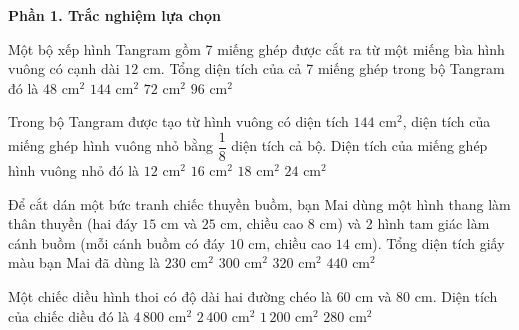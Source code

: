 \textbf{Phần 1. Trắc nghiệm lựa chọn}

\begin{ex} %
Một bộ xếp hình Tangram gồm 7 miếng ghép được cắt ra từ một miếng bìa hình vuông có cạnh dài $12\text{ cm}$. Tổng diện tích của cả 7 miếng ghép trong bộ Tangram đó là
\choice
{$48\text{ cm}^2$}
{\True $144\text{ cm}^2$}
{$72\text{ cm}^2$}
{$96\text{ cm}^2$}
\end{ex}

\begin{ex} %
Trong bộ Tangram được tạo từ hình vuông có diện tích $144\text{ cm}^2$, diện tích của miếng ghép hình vuông nhỏ bằng $\dfrac{1}{8}$ diện tích cả bộ. Diện tích của miếng ghép hình vuông nhỏ đó là
\choice
{$12\text{ cm}^2$}
{$16\text{ cm}^2$}
{\True $18\text{ cm}^2$}
{$24\text{ cm}^2$}
\end{ex}

\begin{ex} %
Để cắt dán một bức tranh chiếc thuyền buồm, bạn Mai dùng một hình thang làm thân thuyền (hai đáy $15\text{ cm}$ và $25\text{ cm}$, chiều cao $8\text{ cm}$) và 2 hình tam giác làm cánh buồm (mỗi cánh buồm có đáy $10\text{ cm}$, chiều cao $14\text{ cm}$). Tổng diện tích giấy màu bạn Mai đã dùng là
\choice
{$230\text{ cm}^2$}
{\True $300\text{ cm}^2$}
{$320\text{ cm}^2$}
{$440\text{ cm}^2$}
\end{ex}

\begin{ex} %
Một chiếc diều hình thoi có độ dài hai đường chéo là $60\text{ cm}$ và $80\text{ cm}$. Diện tích của chiếc diều đó là
\choice
{$4\,800\text{ cm}^2$}
{\True $2\,400\text{ cm}^2$}
{$1\,200\text{ cm}^2$}
{$280\text{ cm}^2$}
\end{ex}


